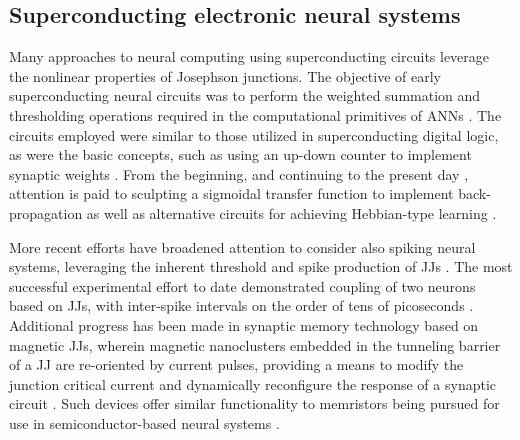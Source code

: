 \documentclass[twocolumn]{article}
\begin{document}
\subsection{Superconducting electronic neural systems}
Many approaches to neural computing using superconducting circuits leverage the nonlinear properties of Josephson junctions. The objective of early superconducting neural circuits was to perform the weighted summation and thresholding operations required in the computational primitives of ANNs \cite{hago1991,hiak1991}. The circuits employed were similar to those utilized in superconducting digital logic, as were the basic concepts, such as using an up-down counter to implement synaptic weights \cite{hiak1991}. From the beginning, and continuing to the present day \cite{sckl2016,klsc2018,sosc2018}, attention is paid to sculpting a sigmoidal transfer function to implement back-propagation as well as alternative circuits for achieving Hebbian-type learning \cite{hago1991}.

More recent efforts have broadened attention to consider also spiking neural systems, leveraging the inherent threshold and spike production of JJs \cite{crsc2010,scdo2018}.  The most successful experimental effort to date demonstrated coupling of two neurons based on JJs, with inter-spike intervals on the order of tens of picoseconds \cite{sele2017}. Additional progress has been made in synaptic memory technology based on magnetic JJs, wherein magnetic nanoclusters embedded in the tunneling barrier of a JJ are re-oriented by current pulses, providing a means to modify the junction critical current and dynamically reconfigure the response of a synaptic circuit \cite{scdo2018}. Such devices offer similar functionality to memristors being pursued for use in semiconductor-based neural systems \cite{kiha2018}.
\end{document}
